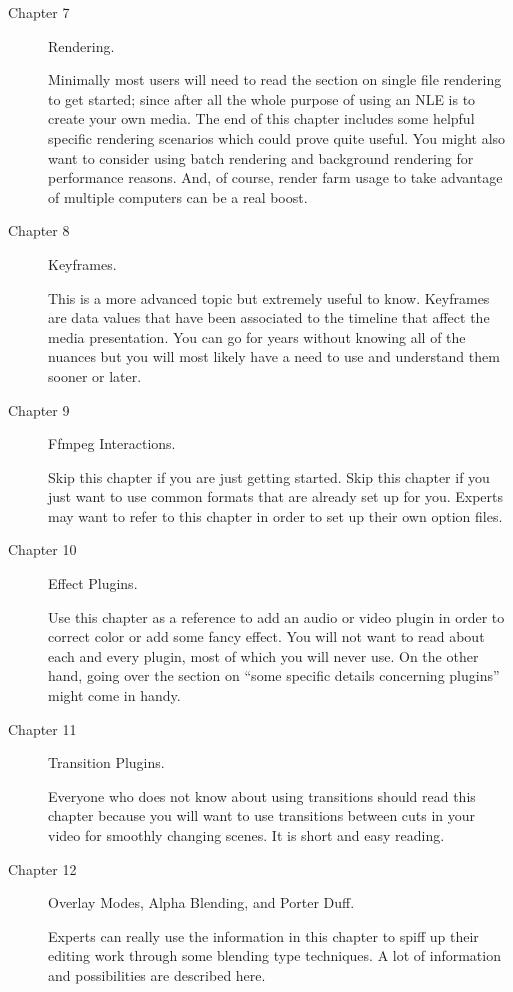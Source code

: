 \begin{description}
    \item[Chapter 7] Rendering.

        Minimally most users will need to read the section on single file rendering to get started; since after all the whole purpose of using an NLE is to create your own media. 
        The end of this chapter includes some helpful specific rendering scenarios which could prove quite useful. 
        You might also want to consider using batch rendering and background rendering for performance reasons. 
        And, of course, render farm usage to take advantage of multiple computers can be a real boost.

    \item[Chapter 8] Keyframes.

        This is a more advanced topic but extremely useful to know. 
        Keyframes are data values that have been associated to the timeline that affect the media presentation. 
        You can go for years without knowing all of the nuances but you will most likely have a need to use and understand them sooner or later.

    \item[Chapter 9] Ffmpeg Interactions.

        Skip this chapter if you are just getting started. Skip this chapter if you just want to use common
        formats that are already set up for you. Experts may want to refer to this chapter in order to set up their
        own option files.

    \item[Chapter 10] Effect Plugins.

        Use this chapter as a reference to add an audio or video plugin in order to correct color or add some fancy effect. 
        You will not want to read about each and every plugin, most of which you will never use.  
        On the other hand, going over the section on “some specific details concerning plugins” might come in handy.

    \item[Chapter 11] Transition Plugins.

        Everyone who does not know about using transitions should read this chapter because you will want to use transitions between cuts in your video for smoothly changing scenes. 
        It is short and easy reading.

    \item[Chapter 12] Overlay Modes, Alpha Blending, and Porter Duff.

        Experts can really use the information in this chapter to spiff up their editing work through some blending type techniques. 
        A lot of information and possibilities are described here.


\end{description}
